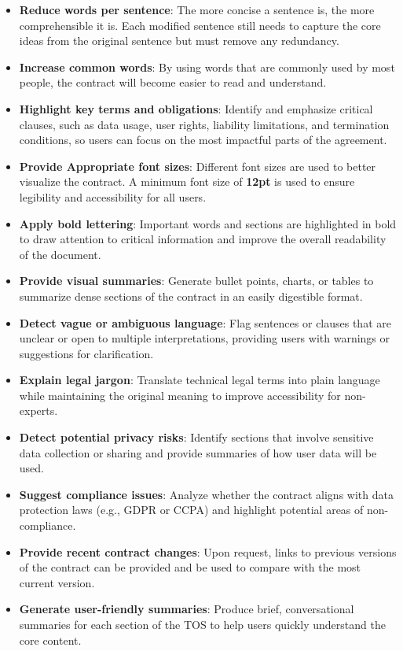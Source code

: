 \documentclass[sigconf, nonacm]{acmart}
\begin{document}
\begin{itemize}
  \item \textbf{Reduce words per sentence}: The more concise a sentence is, the more comprehensible it is. Each modified sentence still needs to capture the core ideas from the original sentence but must remove any redundancy.
  \item \textbf{Increase common words}: By using words that are commonly used by most people, the contract will become easier to read and understand.
  \item \textbf{Highlight key terms and obligations}: Identify and emphasize critical clauses, such as data usage, user rights, liability limitations, and termination conditions, so users can focus on the most impactful parts of the agreement.
  \item \textbf{Provide Appropriate font sizes}: Different font sizes are used to better visualize the contract. A minimum font size of \textbf{12pt} is used to ensure legibility and accessibility for all users.
  \item \textbf{Apply bold lettering}: Important words and sections are highlighted in bold to draw attention to critical information and improve the overall readability of the document.
  \item \textbf{Provide visual summaries}: Generate bullet points, charts, or tables to summarize dense sections of the contract in an easily digestible format.
  \item \textbf{Detect vague or ambiguous language}: Flag sentences or clauses that are unclear or open to multiple interpretations, providing users with warnings or suggestions for clarification.
  \item \textbf{Explain legal jargon}: Translate technical legal terms into plain language while maintaining the original meaning to improve accessibility for non-experts.
  \item \textbf{Detect potential privacy risks}: Identify sections that involve sensitive data collection or sharing and provide summaries of how user data will be used.
  \item \textbf{Suggest compliance issues}: Analyze whether the contract aligns with data protection laws (e.g., GDPR or CCPA) and highlight potential areas of non-compliance.
  \item \textbf{Provide recent contract changes}: Upon request, links to previous versions of the contract can be provided and be used to compare with the most current version.
  \item \textbf{Generate user-friendly summaries}: Produce brief, conversational summaries for each section of the TOS to help users quickly understand the core content.
\end{itemize}
\end{document}
